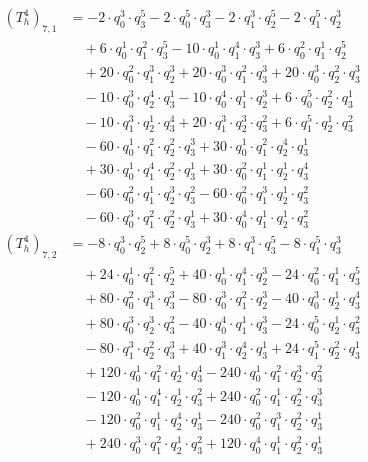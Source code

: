 \begin{align*}(T_{h}^4)_{7,1}&=-2\cdot q_0^{3}\cdot q_3^{5}-2\cdot q_0^{5}\cdot q_3^{3}-2\cdot q_1^{3}\cdot q_2^{5}-2\cdot q_1^{5}\cdot q_2^{3}\\
&\quad +6\cdot q_0^{1}\cdot q_1^{2}\cdot q_3^{5}-10\cdot q_0^{1}\cdot q_1^{4}\cdot q_3^{3}+6\cdot q_0^{2}\cdot q_1^{1}\cdot q_2^{5}\\
&\quad +20\cdot q_0^{2}\cdot q_1^{3}\cdot q_2^{3}+20\cdot q_0^{3}\cdot q_1^{2}\cdot q_3^{3}+20\cdot q_0^{3}\cdot q_2^{2}\cdot q_3^{3}\\
&\quad -10\cdot q_0^{3}\cdot q_2^{4}\cdot q_3^{1}-10\cdot q_0^{4}\cdot q_1^{1}\cdot q_2^{3}+6\cdot q_0^{5}\cdot q_2^{2}\cdot q_3^{1}\\
&\quad -10\cdot q_1^{3}\cdot q_2^{1}\cdot q_3^{4}+20\cdot q_1^{3}\cdot q_2^{3}\cdot q_3^{2}+6\cdot q_1^{5}\cdot q_2^{1}\cdot q_3^{2}\\
&\quad -60\cdot q_0^{1}\cdot q_1^{2}\cdot q_2^{2}\cdot q_3^{3}+30\cdot q_0^{1}\cdot q_1^{2}\cdot q_2^{4}\cdot q_3^{1}\\
&\quad +30\cdot q_0^{1}\cdot q_1^{4}\cdot q_2^{2}\cdot q_3^{1}+30\cdot q_0^{2}\cdot q_1^{1}\cdot q_2^{1}\cdot q_3^{4}\\
&\quad -60\cdot q_0^{2}\cdot q_1^{1}\cdot q_2^{3}\cdot q_3^{2}-60\cdot q_0^{2}\cdot q_1^{3}\cdot q_2^{1}\cdot q_3^{2}\\
&\quad -60\cdot q_0^{3}\cdot q_1^{2}\cdot q_2^{2}\cdot q_3^{1}+30\cdot q_0^{4}\cdot q_1^{1}\cdot q_2^{1}\cdot q_3^{2}\end{align*}
\begin{align*}(T_{h}^4)_{7,2}&=-8\cdot q_0^{3}\cdot q_2^{5}+8\cdot q_0^{5}\cdot q_2^{3}+8\cdot q_1^{3}\cdot q_3^{5}-8\cdot q_1^{5}\cdot q_3^{3}\\
&\quad +24\cdot q_0^{1}\cdot q_1^{2}\cdot q_2^{5}+40\cdot q_0^{1}\cdot q_1^{4}\cdot q_2^{3}-24\cdot q_0^{2}\cdot q_1^{1}\cdot q_3^{5}\\
&\quad +80\cdot q_0^{2}\cdot q_1^{3}\cdot q_3^{3}-80\cdot q_0^{3}\cdot q_1^{2}\cdot q_2^{3}-40\cdot q_0^{3}\cdot q_2^{1}\cdot q_3^{4}\\
&\quad +80\cdot q_0^{3}\cdot q_2^{3}\cdot q_3^{2}-40\cdot q_0^{4}\cdot q_1^{1}\cdot q_3^{3}-24\cdot q_0^{5}\cdot q_2^{1}\cdot q_3^{2}\\
&\quad -80\cdot q_1^{3}\cdot q_2^{2}\cdot q_3^{3}+40\cdot q_1^{3}\cdot q_2^{4}\cdot q_3^{1}+24\cdot q_1^{5}\cdot q_2^{2}\cdot q_3^{1}\\
&\quad +120\cdot q_0^{1}\cdot q_1^{2}\cdot q_2^{1}\cdot q_3^{4}-240\cdot q_0^{1}\cdot q_1^{2}\cdot q_2^{3}\cdot q_3^{2}\\
&\quad -120\cdot q_0^{1}\cdot q_1^{4}\cdot q_2^{1}\cdot q_3^{2}+240\cdot q_0^{2}\cdot q_1^{1}\cdot q_2^{2}\cdot q_3^{3}\\
&\quad -120\cdot q_0^{2}\cdot q_1^{1}\cdot q_2^{4}\cdot q_3^{1}-240\cdot q_0^{2}\cdot q_1^{3}\cdot q_2^{2}\cdot q_3^{1}\\
&\quad +240\cdot q_0^{3}\cdot q_1^{2}\cdot q_2^{1}\cdot q_3^{2}+120\cdot q_0^{4}\cdot q_1^{1}\cdot q_2^{2}\cdot q_3^{1}\end{align*}
